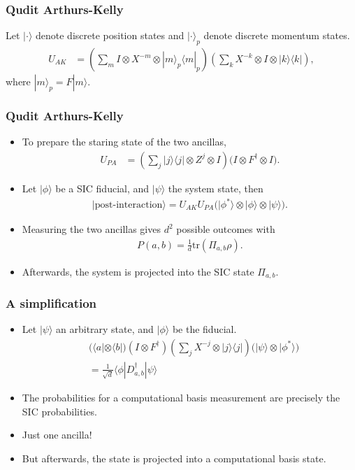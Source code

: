\documentclass{beamer}
\newcommand{\tr}{{\text{tr}}}
\begin{document}
\begin{frame}
\frametitle{Qudit Arthurs-Kelly}
Let $|\cdot \rangle$ denote discrete position states and $|\cdot\rangle_p$ denote discrete momentum states.
\begin{align}
U_{AK} &= \left(\sum_m I \otimes X^{-m} \otimes |m\rangle_p\langle m|_p	\right)\left(\sum_k X^{-k} \otimes I \otimes |k\rangle\langle k|\right),
\end{align}
where $|m\rangle_p = F|m\rangle$.
\end{frame}

\begin{frame}
\frametitle{Qudit Arthurs-Kelly}
\begin{itemize}
 \item To prepare the staring state of the two ancillas,
\begin{align}
U_{PA} &= 	\left(\sum_j |j\rangle\langle j|\otimes Z^j	\otimes I\right)\Big(I \otimes F^\dagger \otimes I\Big).
\end{align}
\item Let $|\phi\rangle$ be a SIC fiducial, and $|\psi\rangle$  the system state, then
\begin{align}
|\text{post-interaction}\rangle=U_{AK}U_{PA}\Big(|\phi^*\rangle	\otimes |\phi\rangle \otimes |\psi\rangle\Big).
\end{align}
\item 	Measuring the two ancillas gives $d^2$ possible outcomes with \begin{align}
 	P(a,b)=\frac{1}{d}\tr(\Pi_{a,b}\rho).
 \end{align}
\item Afterwards, the system is projected into the SIC state $\Pi_{a,b}$.
\end{itemize}
\end{frame}

\begin{frame}
	\frametitle{A simplification}
\begin{itemize}
\item Let  $|\psi\rangle$ an arbitrary state, and $|\phi\rangle$ be the fiducial.
\begin{align}
&\Big(\langle a| \otimes \langle b|\Big)(I\otimes F^\dagger)\left(\sum_j X^{-j}\otimes |j\rangle\langle j|\right)\Big(|\psi\rangle \otimes |\phi^*\rangle	\Big)\nonumber\\
&=\frac{1}{\sqrt{d}}\langle \phi |D_{a,b}^\dagger |\psi\rangle
\end{align}
\item The probabilities for a computational basis measurement are precisely the SIC probabilities.
\item  Just one ancilla!
\item  But afterwards, the state is projected into a computational basis state.
\end{itemize}
\end{frame}
\end{document}

